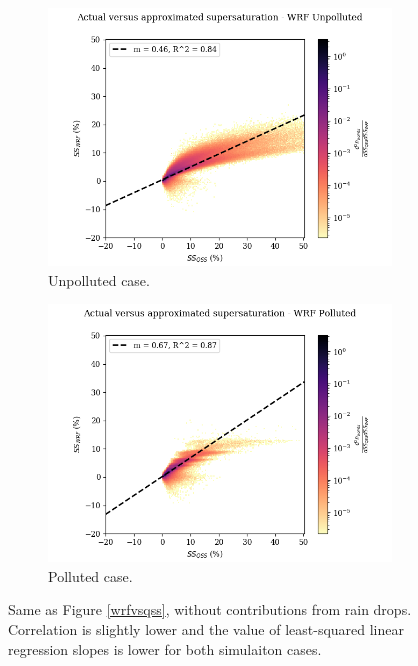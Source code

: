 \documentclass{article}
\begin{document}
\begin{figure}[ht]
	\centering
	\begin{subfigure}{0.7\textwidth}
		\includegraphics[width=\textwidth]{revmywrf/v13_FINAL_heatmap_ss_qss_vs_ss_wrf_Unpolluted_figure.png}
		\caption{Unpolluted case.}
		\label{wrfvsqssunpollv13}
	\end{subfigure}
	\begin{subfigure}{0.7\textwidth}
		\includegraphics[width=\textwidth]{revmywrf/v13_FINAL_heatmap_ss_qss_vs_ss_wrf_Polluted_figure.png}
		\caption{Polluted case.}
		\label{wrfvsqsspollv13}
	\end{subfigure}
	\caption{Same as Figure \ref{wrfvsqss}, without contributions from rain drops. Correlation is slightly lower and the value of least-squared linear regression slopes is lower for both simulaiton cases.}
	\label{wrfvsqssv13}
\end{figure}
\end{document}
